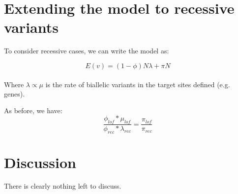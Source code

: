 \documentclass[twoside]{article}
\begin{document}
\section{Extending the model to recessive variants}

To consider recessive cases, we can write the model as:

\huge
$$E(v) = (1-\phi)N\lambda + \pi N $$ \\

\normalsize
Where $\lambda \propto \mu$ is the rate of biallelic variants in the target sites defined (e.g. genes).

As before, we have:
\[
\frac{\phi_{lof} * \mu_{lof}}{\phi_{rec} * \lambda_{rec}} = \frac{\pi_{lof}}{\pi_{rec}} 
\]

\section{Discussion}

There is clearly nothing left to discuss.
\end{document}
